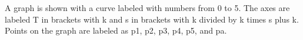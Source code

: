 A graph is shown with a curve labeled with numbers from 0 to 5. The axes are labeled T in brackets with k and s in brackets with k divided by k times s plus k. Points on the graph are labeled as p1, p2, p3, p4, p5, and pa.